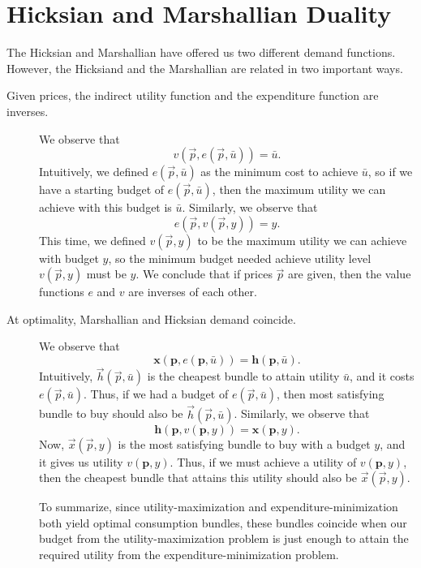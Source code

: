 
\section{Hicksian and Marshallian Duality}
The Hicksian and Marshallian have offered us two different demand functions. However, the Hicksiand and the Marshallian are related in two important ways.
\begin{description}
\item[Given prices, the indirect utility function and the expenditure function are inverses.]
We observe that
$$v(\vec{p}, e(\vec{p}, \bar{u})) = \bar{u}.$$
Intuitively, we defined $e(\vec{p}, \bar{u})$ as the minimum cost to achieve $\bar{u}$, so if we have a starting budget of $e(\vec{p}, \bar{u})$, then the maximum utility we can achieve with this budget is $\bar{u}$.
Similarly, we observe that 
$$e(\vec{p}, v(\vec{p}, y)) = y.$$
This time, we defined $v(\vec{p}, y)$ to be the maximum utility we can achieve with budget $y$, so the minimum budget needed achieve utility level $v(\vec{p}, y)$ must be $y$. We conclude that if prices $\vec{p}$ are given, then the value functions $e$ and $v$ are inverses of each other.

\item[At optimality, Marshallian and Hicksian demand coincide.] 
We observe that 
$$\mathbf{x}(\mathbf{p}, e(\mathbf{p}, \bar{u}))=\mathbf{h}(\mathbf{p}, \bar{u}).$$
Intuitively, $\vec{h}(\vec{p}, \bar{u})$ is the cheapest bundle to attain utility $\bar{u}$, and it costs $e(\vec{p}, \bar{u})$. Thus, if we had a budget of $e(\vec{p}, \bar{u})$, then most satisfying bundle to buy should also be $\vec{h}(\vec{p}, \bar{u})$.
Similarly, we observe that
$$\mathbf{h}(\mathbf{p}, v(\mathbf{p}, y))=\mathbf{x}(\mathbf{p}, y).$$
Now, $\vec{x}(\vec{p}, y)$ is the most satisfying bundle to buy with a budget $y$, and it gives us utility $v(\mathbf{p}, y)$. Thus, if we must achieve a utility of $v(\mathbf{p}, y)$, then the cheapest bundle that attains this utility should also be $\vec{x}(\vec{p}, y)$. 

To summarize, since utility-maximization and expenditure-minimization both yield optimal consumption bundles, these bundles coincide when our budget from the utility-maximization problem is just enough to attain the required utility from the expenditure-minimization problem. 
\end{description}

